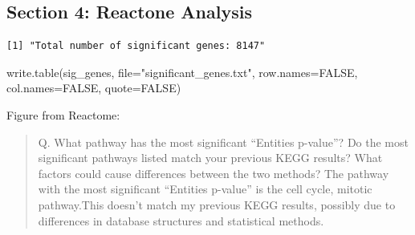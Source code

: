 \documentclass[
  letterpaper,
  DIV=11,
  numbers=noendperiod]{scrartcl}
\makeatletter
\newenvironment{Shaded}{\begin{snugshade}}{\end{snugshade}}
\newcommand{\AttributeTok}[1]{\textcolor[rgb]{0.40,0.45,0.13}{#1}}
\newcommand{\ConstantTok}[1]{\textcolor[rgb]{0.56,0.35,0.01}{#1}}
\newcommand{\FloatTok}[1]{\textcolor[rgb]{0.68,0.00,0.00}{#1}}
\newcommand{\FunctionTok}[1]{\textcolor[rgb]{0.28,0.35,0.67}{#1}}
\newcommand{\NormalTok}[1]{\textcolor[rgb]{0.00,0.23,0.31}{#1}}
\newcommand{\OtherTok}[1]{\textcolor[rgb]{0.00,0.23,0.31}{#1}}
\newcommand{\SpecialCharTok}[1]{\textcolor[rgb]{0.37,0.37,0.37}{#1}}
\newcommand{\StringTok}[1]{\textcolor[rgb]{0.13,0.47,0.30}{#1}}
\newcommand*\pandocbounded[1]{%
  \sbox\pandoc@box{#1}%
  \Gscale@div\@tempa{\textheight}{\dimexpr\ht\pandoc@box+\dp\pandoc@box\relax}%
  \Gscale@div\@tempb{\linewidth}{\wd\pandoc@box}%
  \ifdim\@tempb\p@<\@tempa\p@\let\@tempa\@tempb\fi%
  \ifdim\@tempa\p@<\p@\scalebox{\@tempa}{\usebox\pandoc@box}%
  \else\usebox{\pandoc@box}%
  \fi%
}
\makeatother
\begin{document}
\subsection{Section 4: Reactone
Analysis}\label{section-4-reactone-analysis}

\begin{Shaded}
\end{Shaded}

\begin{verbatim}
[1] "Total number of significant genes: 8147"
\end{verbatim}

\begin{Shaded}
\begin{Highlighting}[]
\FunctionTok{write.table}\NormalTok{(sig\_genes, }\AttributeTok{file=}\StringTok{"significant\_genes.txt"}\NormalTok{, }\AttributeTok{row.names=}\ConstantTok{FALSE}\NormalTok{, }\AttributeTok{col.names=}\ConstantTok{FALSE}\NormalTok{, }\AttributeTok{quote=}\ConstantTok{FALSE}\NormalTok{)}
\end{Highlighting}
\end{Shaded}

Figure from Reactome:
\pandocbounded{}

\begin{quote}
Q. What pathway has the most significant ``Entities p-value''? Do the
most significant pathways listed match your previous KEGG results? What
factors could cause differences between the two methods? The pathway
with the most significant ``Entities p-value'' is the cell cycle,
mitotic pathway.This doesn't match my previous KEGG results, possibly
due to differences in database structures and statistical methods.
\end{quote}
\end{document}
